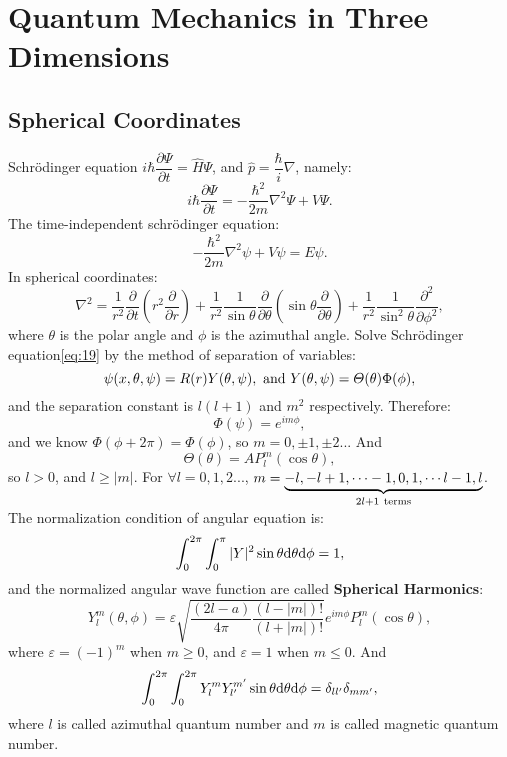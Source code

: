 \documentclass[12pt, 
]{article}
\begin{document}
\newpage

\section{Quantum Mechanics in Three Dimensions}
\subsection{Spherical Coordinates}
Schr\"odinger equation $i\hbar\dfrac{\partial \varPsi}{\partial t}=\hat{H}\varPsi$, and $\hat{p}=\dfrac{\hbar}{i}\nabla$, namely:
\begin{equation}\label{eq:18}
	i\hbar\frac{\partial\varPsi}{\partial t}=-\frac{\hbar^2}{2m}\nabla^2\varPsi+V\varPsi.
\end{equation}
The time-independent schr\"odinger equation:
\begin{equation}\label{eq:19}
	-\frac{\hbar^2}{2m}\nabla^2\psi+V\psi=E\psi.
\end{equation}
In spherical coordinates:
\[
	\nabla^2=\frac{1}{r^2}\frac{\partial}{\partial t}\left(r^2\frac{\partial}{\partial r}\right)+\frac{1}{r^2}\frac{1}{\sin\theta}\frac{\partial}{\partial\theta}\left(\sin\theta\frac{\partial}{\partial\theta}\right)+\frac{1}{r^2}\frac{1}{\sin^2\theta}\frac{\partial^2}{\partial \phi^2},
\]
where $\theta$ is the polar angle and $\phi$ is the azimuthal angle. Solve Schrödinger equation\eqref{eq:19} by the method of separation of variables:
\[
	\psi(x,\theta,\psi)=R(r)Y(\theta,\psi),~{\rm and~}Y(\theta,\psi)=\varTheta(\theta)\Phi(\phi),
\]
and the separation constant is $l(l+1)$ and $m^2$ respectively. Therefore:
\[
	\Phi(\psi)=e^{im\phi},
\]
and we know $\Phi(\phi+2\pi)=\Phi(\phi)$, so $m=0,\pm1,\pm2...$
And \[
	\varTheta(\theta)=AP_l^m(\cos\theta),
\]
so $l>0$, and $l\geqslant|m|$. For $\forall l=0,1,2...$, $m=\underbrace{-l,-l+1,\cdots-1,0,1,\cdots l-1,l}_{2l+1~{\rm terms}}$.\\
The normalization condition of angular equation is:
\[
	\int_0^{2\pi}\int_0^{\pi}|Y|^2\sin\theta{\rm d}\theta{\rm d}\phi=1,
\]
and the normalized angular wave function are called {\bf Spherical Harmonics}:
\[
	Y_l^m(\theta,\phi)=\varepsilon\sqrt{\frac{(2l-a)}{4\pi}\frac{(l-|m|)!}{(l+|m|)!}}e^{im\phi}P_l^m(\cos\theta),
\]
where $\varepsilon=(-1)^m$ when $m\geqslant0$, and $\varepsilon=1$ when $m\leqslant0$. And
\[
	\int_0^{2\pi}\int_0^{2\pi}Y_l^mY_{l'}^{m'}\sin\theta{\rm d}\theta{\rm d}\phi=\delta_{ll'}\delta_{mm'},
\]
where $l$ is called azimuthal quantum number and $m$ is called magnetic quantum number.
\\
\end{document}
